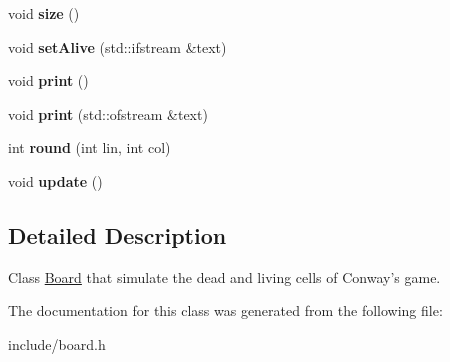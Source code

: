 \begin{DoxyCompactItemize}
\item 
\hypertarget{class_board_aa4201b6fd7a234af389ed727a289aaaf}{void {\bfseries size} ()}\label{class_board_aa4201b6fd7a234af389ed727a289aaaf}

\item 
\hypertarget{class_board_a32afb2fc1f8d02d025c7f8052b09973e}{void {\bfseries set\-Alive} (std\-::ifstream \&text)}\label{class_board_a32afb2fc1f8d02d025c7f8052b09973e}

\item 
\hypertarget{class_board_a44c7bca1c10c053898c048dc4c13f0d5}{void {\bfseries print} ()}\label{class_board_a44c7bca1c10c053898c048dc4c13f0d5}

\item 
\hypertarget{class_board_a98bb9b28e1d479d739afb2d5ac4ccd49}{void {\bfseries print} (std\-::ofstream \&text)}\label{class_board_a98bb9b28e1d479d739afb2d5ac4ccd49}

\item 
\hypertarget{class_board_adb5815b3d889511e8e1426941d5c8f69}{int {\bfseries round} (int lin, int col)}\label{class_board_adb5815b3d889511e8e1426941d5c8f69}

\item 
\hypertarget{class_board_aa170cb05bb38de48e19a72b51d898eca}{void {\bfseries update} ()}\label{class_board_aa170cb05bb38de48e19a72b51d898eca}

\end{DoxyCompactItemize}


\subsection{Detailed Description}
Class \hyperlink{class_board}{Board} that simulate the dead and living cells of Conway's game. 

The documentation for this class was generated from the following file\-:\begin{DoxyCompactItemize}
\item 
include/board.\-h\end{DoxyCompactItemize}
